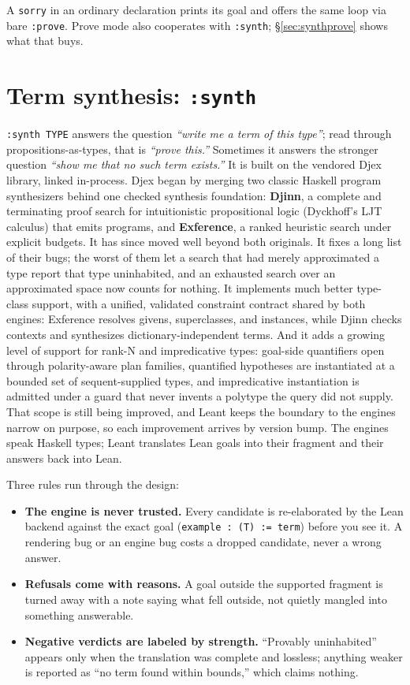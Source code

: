 \documentclass[11pt,oneside]{article}
\newcommand{\code}[1]{\texttt{#1}}
\begin{document}
A \code{sorry} in an ordinary declaration prints its goal and offers
the same loop via bare \code{:prove}. Prove mode also cooperates with
\code{:synth}; \S\ref{sec:synthprove} shows what that buys.

\section{Term synthesis: \code{:synth}}\label{sec:synth}

\code{:synth TYPE} answers the question \emph{``write me a term of
this type''}; read through propositions-as-types, that is
\emph{``prove this.''} Sometimes it answers the stronger question
\emph{``show me that no such term exists.''} It is built on the
vendored Djex library, linked in-process. Djex began by merging two
classic Haskell program synthesizers behind one checked synthesis
foundation: \textbf{Djinn}, a complete and terminating proof
search for intuitionistic propositional logic (Dyckhoff's LJT
calculus) that emits programs, and \textbf{Exference}, a ranked
heuristic search under explicit budgets. It has since moved well
beyond both originals. It fixes a long list of their bugs; the worst
of them let a search that had merely approximated a type report that
type uninhabited, and an exhausted search over an approximated space
now counts for nothing.
It implements much better type-class support, with a unified,
validated constraint contract shared by both engines: Exference
resolves givens, superclasses, and instances, while Djinn checks
contexts and synthesizes dictionary-independent terms. And it adds a
growing level of support for rank-N and impredicative types: goal-side
quantifiers open through polarity-aware plan families, quantified
hypotheses are instantiated at a bounded set of sequent-supplied
types, and impredicative instantiation is admitted under a guard that
never invents a polytype the query did not supply. That scope is
still being improved, and Leant keeps the boundary to the engines
narrow on purpose, so each improvement arrives by version bump. The engines speak Haskell types; Leant translates Lean
goals into their fragment and their answers back into Lean.

Three rules run through the design:

\begin{itemize}
\item \textbf{The engine is never trusted.} Every candidate is
  re-elaborated by the Lean backend against the exact goal
  (\code{example :\ (T) :=\ term}) before you see it. A rendering bug
  or an engine bug costs a dropped candidate, never a wrong answer.
\item \textbf{Refusals come with reasons.} A goal outside the
  supported fragment is turned away with a note saying what fell
  outside, not quietly mangled into something answerable.
\item \textbf{Negative verdicts are labeled by strength.}
  ``Provably uninhabited'' appears only when the translation was
  complete and lossless; anything weaker is reported as ``no term
  found within bounds,'' which claims nothing.
\end{itemize}
\end{document}
